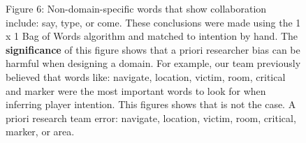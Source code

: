\begin{figure}[h!]
    \centering
    \caption{Figure 6: Non-domain-specific words that show collaboration include: say, type, or come. These conclusions were made using the 1 x 1 Bag of Words algorithm and matched to intention by hand. The \textbf{significance} of this figure shows that a priori researcher bias can be harmful when designing a domain. For example, our team previously believed that words like: navigate, location, victim, room, critical and marker were the most important words to look for when inferring player intention. This figures shows that is not the case. A priori research team error: navigate, location, victim, room, critical, marker, or area.}
    \end{figure}
    
   

